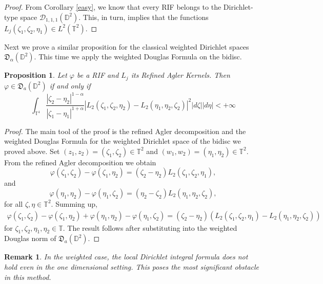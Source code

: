 \documentclass[11pt]{amsart}
\newtheorem{proposition}[theorem]{Proposition}
\newtheorem{remark}[theorem]{Remark}
\numberwithin{equation}{section}
\begin{document}
\begin{proof} From Corollary \ref{easy}, we know that every RIF belongs to the Dirichlet-type space $\mathcal{D}_{1,1,1}(\mathbb{D}^2).$ This, in turn, implies that the functions $L_{j}(\zeta_1,\zeta_2,\eta_1)\in L^2(\mathbb{T}^2).$ 
\end{proof}
Next we prove a similar proposition for the classical weighted Dirichlet spaces $\mathfrak{D}_{\alpha}(\mathbb{D}^2)$. This time we apply the weighted Douglas Formula on the bidisc.
\begin{proposition}
Let $\varphi$ be a RIF and $L_j$ its Refined Agler Kernels. Then $\varphi\in\mathfrak{D}_{a}(\mathbb{D}^2)$ if and only if
$$\int_{\mathbb{T}^4}\frac{|\zeta_2-\eta_2|^{1-\alpha}}{|\zeta_1-\eta_1|^{1+\alpha}}|L_2(\zeta_1,\zeta_2,\eta_2)-L_2(\eta_1,\eta_2,\zeta_2)|^2|d\zeta||d\eta|<+\infty$$
\label{prop}
\end{proposition}
\begin{proof} The main tool of the proof is the refined Agler decomposition and the weighted Douglas Formula for the weighted Dirichlet space of the bidisc we proved above. Set $(z_1,z_2)=(\zeta_1,\zeta_2)\in\mathbb{T}^2$ and $(w_1,w_2)=(\eta_1,\eta_2)\in\mathbb{T}^2$. From the refined Agler decomposition we obtain
$$\varphi(\zeta_1,\zeta_2)-\varphi(\zeta_1,\eta_2)=(\zeta_2-\eta_2)L_2(\zeta_1,\zeta_2,\eta_1),$$
and
$$\varphi(\eta_1,\eta_2)-\varphi(\eta_1,\zeta_2)=(\eta_2-\zeta_2)L_2(\eta_1,\eta_2,\zeta_2),$$
for all $\zeta,\eta\in \mathbb{T}^2.$
Summing up,
\begin{align}
\varphi(\zeta_1,\zeta_2)-\varphi(\zeta_1,\eta_2)+\varphi(\eta_1,\eta_2)-\varphi(\eta_1,\zeta_2)=(\zeta_2-\eta_2)(L_2(\zeta_1,\zeta_2,\eta_1)-L_2(\eta_1,\eta_2,\zeta_2))
\end{align}
for $\zeta_1,\zeta_2,\eta_1,\eta_2\in \mathbb{T}.$
The result follows after substituting into the weighted Douglas norm of $\mathfrak{D}_{a}(\mathbb{D}^2).$
\end{proof}
\begin{remark}
    In the weighted case, the local Dirichlet integral formula does not hold even in the one dimensional setting. This poses the most significant obstacle in this method.
\end{remark}
\end{document}
